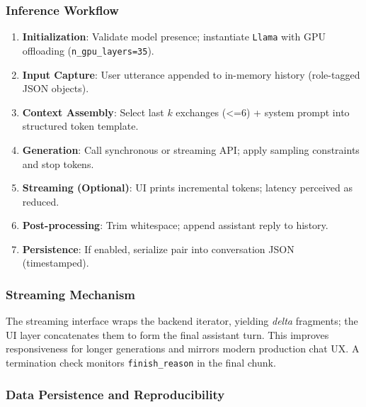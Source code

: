 \documentclass[12pt,a4paper]{article}
\begin{document}
\subsubsection*{Inference Workflow}

\begin{enumerate}[leftmargin=1.2em]
    \item \textbf{Initialization}: Validate model presence; instantiate \texttt{Llama} with GPU offloading (\texttt{n\_gpu\_layers=35}).
    \item \textbf{Input Capture}: User utterance appended to in-memory history (role-tagged JSON objects).
    \item \textbf{Context Assembly}: Select last $k$ exchanges (<=6) + system prompt into structured token template.
    \item \textbf{Generation}: Call synchronous or streaming API; apply sampling constraints and stop tokens.
    \item \textbf{Streaming (Optional)}: UI prints incremental tokens; latency perceived as reduced.
    \item \textbf{Post-processing}: Trim whitespace; append assistant reply to history.
    \item \textbf{Persistence}: If enabled, serialize pair into conversation JSON (timestamped). 
\end{enumerate}

\subsubsection*{Streaming Mechanism}

The streaming interface wraps the backend iterator, yielding \emph{delta} fragments; the UI layer concatenates them to form the final assistant turn. This improves responsiveness for longer generations and mirrors modern production chat UX. A termination check monitors \texttt{finish\_reason} in the final chunk.

\subsubsection*{Data Persistence and Reproducibility}
\end{document}
